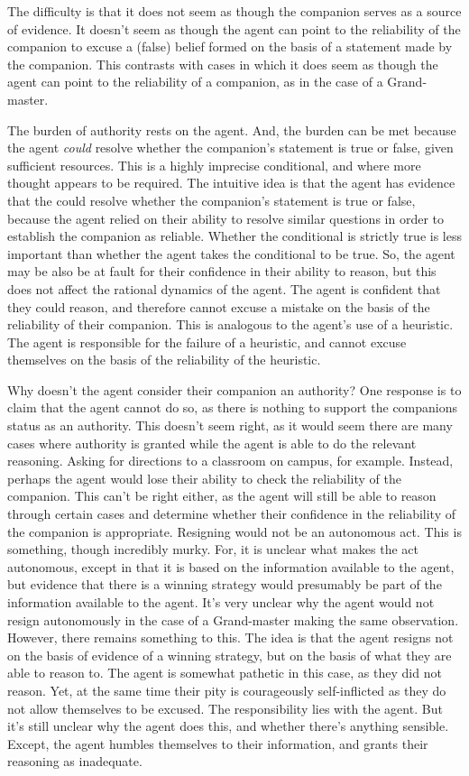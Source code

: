 \documentclass[10pt]{article}
\begin{document}
The difficulty is that it does not seem as though the companion serves as a source of evidence.
It doesn't seem as though the agent can point to the reliability of the companion to excuse a (false) belief formed on the basis of a statement made by the companion.
This contrasts with cases in which it does seem as though the agent can point to the reliability of a companion, as in the case of a Grand-master.

The burden of authority rests on the agent.
And, the burden can be met because the agent \emph{could} resolve whether the companion's statement is true or false, given sufficient resources.
This is a highly imprecise conditional, and where more thought appears to be required.
The intuitive idea is that the agent has evidence that the could resolve whether the companion's statement is true or false, because the agent relied on their ability to resolve similar questions in order to establish the companion as reliable.
Whether the conditional is strictly true is less important than whether the agent takes the conditional to be true.
So, the agent may be also be at fault for their confidence in their ability to reason, but this does not affect the rational dynamics of the agent.
The agent is confident that they could reason, and therefore cannot excuse a mistake on the basis of the reliability of their companion.
This is analogous to the agent's use of a heuristic.
The agent is responsible for the failure of a heuristic, and cannot excuse themselves on the basis of the reliability of the heuristic.

Why doesn't the agent consider their companion an authority?
One response is to claim that the agent cannot do so, as there is nothing to support the companions status as an authority.
This doesn't seem right, as it would seem there are many cases where authority is granted while the agent is able to do the relevant reasoning.
Asking for directions to a classroom on campus, for example.
Instead, perhaps the agent would lose their ability to check the reliability of the companion.
This can't be right either, as the agent will still be able to reason through certain cases and determine whether their confidence in the reliability of the companion is appropriate.
Resigning would not be an autonomous act.
This is something, though incredibly murky.
For, it is unclear what makes the act autonomous, except in that it is based on the information available to the agent, but evidence that there is a winning strategy would presumably be part of the information available to the agent.
It's very unclear why the agent would not resign autonomously in the case of a Grand-master making the same observation.
However, there remains something to this.
The idea is that the agent resigns not on the basis of evidence of a winning strategy, but on the basis of what they are able to reason to.
The agent is somewhat pathetic in this case, as they did not reason.
Yet, at the same time their pity is courageously self-inflicted as they do not allow themselves to be excused.
The responsibility lies with the agent.
But it's still unclear why the agent does this, and whether there's anything sensible.
Except, the agent humbles themselves to their information, and grants their reasoning as inadequate.
\end{document}
